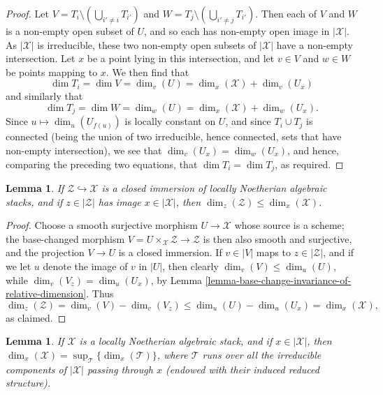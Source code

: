 \documentclass{stacks-project}
\theoremstyle{plain}
\newtheorem{lemma}[subsection]{Lemma}
\theoremstyle{definition}
\theoremstyle{remark}
\numberwithin{equation}{subsection}
\begin{document}
\begin{proof}
\medskip\noindent
Let $V = T_i \setminus (\bigcup_{i' \neq i} T_{i'})$
and $W = T_j \setminus (\bigcup_{i' \neq j} T_{i'})$.
Then each of $V$ and $W$ is a non-empty open subset of $U$,
and so each has non-empty open image in $|\mathcal{X}|$.  As $|\mathcal{X}|$ is
irreducible,
these two non-empty open subsets of $|\mathcal{X}|$ have a non-empty
intersection.
Let $x$ be a point lying in this intersection, and let $v \in V$ and
$w\in W$ be points mapping to $x$.
We then find that
$$
\dim T_i = \dim V = \dim_v (U) = \dim_x (\mathcal{X}) + \dim_v (U_x)
$$
and similarly that
$$
\dim T_j = \dim W = \dim_w (U) = \dim_x (\mathcal{X}) + \dim_w (U_x).
$$
Since $u \mapsto \dim_u (U_{f(u)})$ is locally constant on $U$,
and since $T_i \cup T_j$ is connected (being the union of two irreducible,
hence connected, sets that have non-empty intersection),
we see that $\dim_v (U_x) = \dim_w(U_x)$,
and hence, comparing the preceding two equations,
that $\dim T_i = \dim T_j$, as required.
\end{proof}

\begin{lemma}
\label{lemma-closed-immersions}
If $\mathcal{Z} \hookrightarrow \mathcal{X}$ is a closed immersion
of locally Noetherian algebraic stacks,
and if $z \in |\mathcal{Z}|$ has image $x \in |\mathcal{X}|$,
then $\dim_z (\mathcal{Z}) \leq \dim_x(\mathcal{X})$.
\end{lemma}

\begin{proof}
Choose a smooth surjective morphism
$U\to \mathcal{X}$ whose source is a scheme;
the base-changed morphism
$V = U\times_{\mathcal{X}} \mathcal{Z} \to \mathcal{Z}$
is then also smooth and surjective, and the projection
$V \to U$ is a closed immersion.
If $v \in |V|$ maps to $z \in |\mathcal{Z}|$, and
if we let $u$ denote the image of $v$ in $|U|$,
then clearly
$\dim_v(V) \leq \dim_u(U)$,
while
$\dim_v (V_z) = \dim_u(U_x)$,
by Lemma \ref{lemma-base-change-invariance-of-relative-dimension}.
Thus
$$
\dim_z(\mathcal{Z})  = \dim_v(V) - \dim_v(V_z)
\leq \dim_u(U) - \dim_u(U_x) = \dim_x(\mathcal{X}),
$$
as claimed.
\end{proof}

\begin{lemma}
\label{lemma-dimension-via-components}
If $\mathcal{X}$ is a locally Noetherian algebraic stack, and if
$x \in |\mathcal{X}|$,
then $\dim_x(\mathcal{X}) = \sup_{\mathcal{T}} \{ \dim_x(\mathcal{T}) \} $,
where $\mathcal{T}$ runs over all the irreducible components
of $|\mathcal{X}|$ passing through $x$ (endowed with their
induced reduced structure).
\end{lemma}
\end{document}
